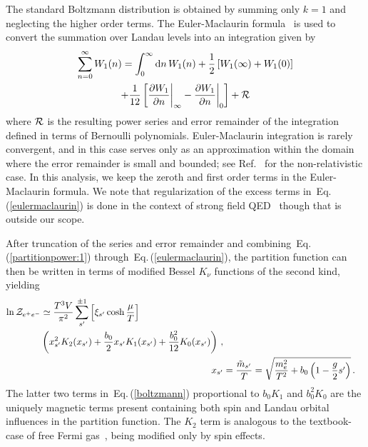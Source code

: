 \documentclass[aps,prd,floatfix,reprint]{revtex4-2}
\newcommand{\req}[1]{Eq.\,(\ref{#1})}
\begin{document}
The standard Boltzmann distribution is obtained by summing only $k=1$ and neglecting the higher order terms. The Euler-Maclaurin formula~\cite{abramowitz1988handbook} is used to convert the summation over Landau levels into an integration given by
\begin{multline}
 \label{eulermaclaurin}
 \sum_{n=0}^{\infty}W_{1}(n)=\int_{0}^{\infty}{\rm d}n\,W_{1}(n)+\frac{1}{2}\left[W_{1}(\infty)+W_{1}(0)\right]\\
 +\frac{1}{12}\left[\frac{\partial W_{1}}{\partial n}\bigg\vert_{\infty}-\frac{\partial W_{1}}{\partial n}\bigg\vert_{0}\right]+{\cal R}
\end{multline}
where ${\cal R}$ is the resulting power series and error remainder of the integration defined in terms of Bernoulli polynomials. Euler-Maclaurin integration is rarely convergent, and in this case serves only as an approximation within the domain where the error remainder is small and bounded; see Ref.~\cite{greiner2012thermodynamics} for the non-relativistic case. In this analysis, we keep the zeroth and first order terms in the Euler-Maclaurin formula. We note that regularization of the excess terms in~\req{eulermaclaurin} is done in the context of strong field QED~\cite{greiner2008quantum} though that is outside our scope.

After truncation of the series and error remainder and combining~\req{partitionpower:1} through~\req{eulermaclaurin}, the partition function can then be written in terms of modified Bessel $K_{\nu}$ functions of the second kind, yielding
\begin{align}
 \begin{split}
 \label{boltzmann}
 \ln{\cal Z}_{e^{+}e^{-}}&\simeq\frac{T^{3}V}{\pi^{2}}\sum_{s'}^{\pm1}\left[\xi_{s'}\cosh{\frac{\mu}{T}}\right]\\
 &\left(x_{s'}^{2}K_{2}(x_{s'})+\frac{b_{0}}{2}x_{s'}K_{1}(x_{s'})+\frac{b_{0}^{2}}{12}K_{0}(x_{s'})\right)\,,
 \end{split}\\
 \label{xfunc}
 x_{s'}&=\frac{{\tilde m}_{s'}}{T}=\sqrt{\frac{m_{e}^{2}}{T^{2}}+b_{0}\left(1-\frac{g}{2}s'\right)}\,.
\end{align}
The latter two terms in~\req{boltzmann} proportional to $b_{0}K_{1}$ and $b_{0}^{2}K_{0}$ are the uniquely magnetic terms present containing both spin and Landau orbital influences in the partition function. The $K_{2}$ term is analogous to the textbook-case of free Fermi gas~\cite{greiner2012thermodynamics}, being modified only by spin effects.
\end{document}
